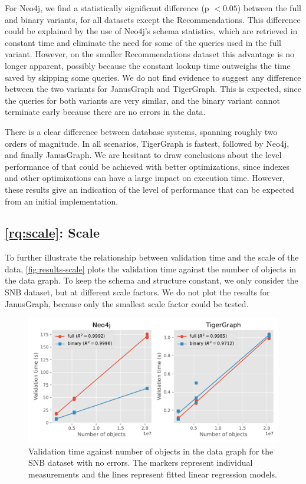 \documentclass{report}
\theoremstyle{definition}
\begin{document}
For Neo4j, we find a statistically significant difference (p $< 0.05$) between the full and binary variants, for all datasets except the Recommendations. This difference could be explained by the use of Neo4j's schema statistics, which are retrieved in constant time and eliminate the need for some of the queries used in the full variant. However, on the smaller Recommendations dataset this advantage is no longer apparent, possibly because the constant lookup time outweighs the time saved by skipping some queries. We do not find evidence to suggest any difference between the two variants for JanusGraph and TigerGraph. This is expected, since the queries for both variants are very similar, and the binary variant cannot terminate early because there are no errors in the data.

There is a clear difference between database systems, spanning roughly two orders of magnitude. In all scenarios, TigerGraph is fastest, followed by Neo4j, and finally JanusGraph. We are hesitant to draw conclusions about the level performance of that could be achieved with better optimizations, since indexes and other optimizations can have a large impact on execution time. However, these results give an indication of the level of performance that can be expected from an initial implementation.

\subsection{\ref*{rq:scale}: Scale}

To further illustrate the relationship between validation time and the scale of the data, \autoref{fig:results-scale} plots the validation time against the number of objects in the data graph. To keep the schema and structure constant, we only consider the SNB dataset, but at different scale factors. We do not plot the results for JanusGraph, because only the smallest scale factor could be tested.

\begin{figure}[t]
  \centering
  \includegraphics[scale=0.5]{figures/results-scale.pdf}
  \caption[Validation time against number of objects in the data graph]{Validation time against number of objects in the data graph for the SNB dataset with no errors. The markers represent individual measurements and the lines represent fitted linear regression models.}
  \label{fig:results-scale}
\end{figure}
\end{document}
